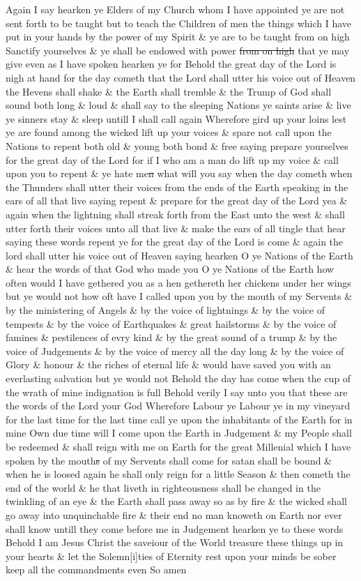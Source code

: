 				Again I say hearken ye Elders of my Church whom I have appointed ye are not sent forth to be taught but to teach the Children of men the things which I have put in your hands by the power of my Spirit \& ye are to be taught from on high Sanctify yourselves \& ye shall be endowed with power \sout{from on high} that ye may give even as I have spoken hearken ye for Behold the great day of the Lord is nigh at hand for the day cometh that the Lord shall utter his voice out of Heaven the Hevens shall shake \& the Earth shall tremble \& the Trump of God shall sound both long \& loud \& shall say to the sleeping Nations ye saints arise \& live ye sinners stay \& sleep untill I shall call again Wherefore gird up your loins lest ye are found among the wicked lift up your voices \& spare not call upon the Nations to repent both old \& young both bond \& free saying prepare yourselves for the great day of the Lord for if I who am a man do lift up my voice \& call upon you to repent \& ye hate me\sout{n} what will you say when the day cometh when the Thunders shall utter their voices from the ends of the Earth speaking in the ears of all that live saying repent \& prepare for the great day of the Lord yea \& again when the lightning shall streak forth from the East unto the west \& shall utter forth their voices unto all that live \& make the ears of all tingle that hear saying these words repent ye for the great day of the Lord is come \& again the lord shall utter his voice out of Heaven saying hearken O ye Nations of the Earth \& hear the words of that God who made you O ye Nations of the Earth how often would I have gethered you as a hen gethereth her chickens under her wings but ye would not how oft have I called upon you by the mouth of my Servents \& by the ministering of Angels \& by the voice of lightnings \& by the voice of tempests \& by the voice of Earthquakes \& great hailstorms \& by the voice of famines \& pestilences of evry kind \& by the great sound of a trump \& by the voice of Judgements \& by the voice of mercy all the day long \& by the voice of Glory \& honour \& the riches of eternal life \& would have saved you with an everlasting salvation but ye would not Behold the day has come when the cup of the wrath of mine indignation is full Behold verily I say unto you that these are the words of the Lord your God Wherefore Labour ye Labour ye in my vineyard for the last time for the last time call ye upon the inhabitants of the Earth for in mine Own due time will I come upon the Earth in Judgement \& my People shall be redeemed \& shall reign with me on Earth for the great Millenial which I have spoken by the mouth\sout{s} of my Servents shall come for satan shall be bound \& when he is loosed again he shall only reign for a little Season \& then cometh the end of the world \& he that liveth in righteousness shall be changed in the twinkling of an eye \& the Earth shall pass away so as by fire \& the wicked shall go away into unquinchable fire \& their end no man knoweth on Earth nor ever shall know untill they come before me in Judgement hearken ye to these words Behold I am Jesus Christ the saveiour of the World treasure these things up in your hearts \& let the Solemn[i]ties of Eternity rest upon your minds be sober keep all the commandments even So amen
				
